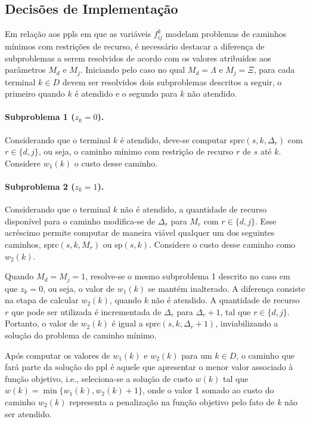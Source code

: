 \subsection{Decisões de Implementação} \label{subsec:rl-m-valor}

Em relação aos \gls{ppl}s em que  as variáveis $f_{ij}^{k}$ modelam problemas de
caminhos mínimos com restrições de recurso, é necessário destacar a diferença de
subproblemas  a  serem  resolvidos  de  acordo com  os  valores  atribuídos  aos
parâmetros $M_d$ e $M_j$.  Iniciando pelo caso no qual $M_d =  \Lambda$ e $M_j =
\Xi$,  para cada  terminal  $k \in  D$ devem  ser  resolvidos dois  subproblemas
descritos a seguir,  o primeiro quando $k$  é atendido e o segundo  para $k$ não
atendido.

\noindent \paragraph*{Subproblema  1 ($z_k =  0$).} Considerando que  o terminal
$k$ é  atendido, deve-se computar \gls{sprc}$(s,  k, \Delta_r)$ com $r  \in \{d,
j\}$, ou  seja, o caminho mínimo  com restrição de  recurso $r$ de $s$  até $k$.
Considere $w_1(k)$ o custo desse caminho.

\noindent \paragraph*{Subproblema  2 ($z_k =  1$).} Considerando que  o terminal
$k$  não  é  atendido,  a  quantidade  de  recurso  disponível  para  o  caminho
modifica-se  de $\Delta_r$  para  $M_r$ com  $r \in  \{d,  j\}$. Esse  acréscimo
permite  computar  de  maneira  viável   qualquer  um  dos  seguintes  caminhos,
\gls{sprc}$(s, k,  M_r)$ ou  \gls{sp}$(s, k)$. Considere  o custo  desse caminho
como $w_2(k)$.

Quando $M_d = M_j = 1$, resolve-se o mesmo subproblema 1 descrito no caso em que
$z_k  = 0$,  ou seja,  o valor  de $w_1(k)$  se mantém  inalterado. A  diferença
consiste na etapa de calcular $w_2(k)$,  quando $k$ não é atendido. A quantidade
de  recurso  $r$ que  pode  ser  utilizada  é  incrementada de  $\Delta_r$  para
$\Delta_r + 1$, tal que $r \in \{d,  j\}$. Portanto, o valor de $w_2(k)$ é igual
a \gls{sprc}$(s,  k, \Delta_r  + 1)$,  inviabilizando a  solução do  problema de
caminho mínimo.

Após computar  os valores de  $w_1(k) \text{ e  } w_2(k)$ para  um $k \in  D$, o
caminho que fará parte  da solução do \gls{ppl} é aquele  que apresentar o menor
valor associado à função objetivo, i.e.,  seleciona-se a solução de custo $w(k)$
tal que  $w(k) =  \min\{w_1(k),w_2(k)+1\}$, onde  o valor 1  somado ao  custo do
caminho $w_2(k)$  representa a penalização na  função objetivo pelo fato  de $k$
não ser atendido.

